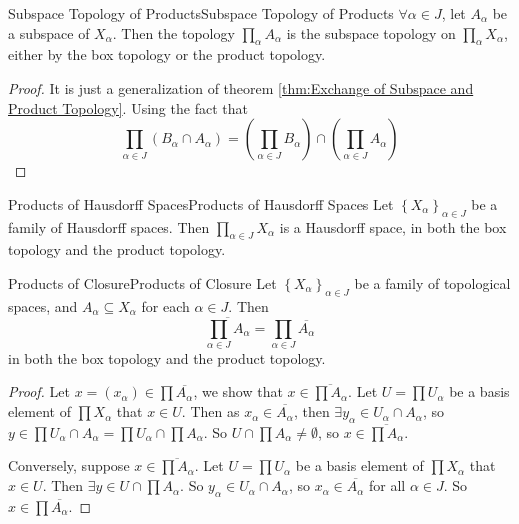 \documentclass[../main.tex]{subfiles}
\begin{document}
\begin{theorem}{Subspace Topology of Products}{Subspace Topology of Products}
$\forall \alpha\in J$, let $A_{\alpha}$ be a subspace of $X_{\alpha}$. Then the topology $\prod_{\alpha} A_{\alpha}$ is the subspace topology on $\prod_{\alpha} X_{\alpha}$, either by the box topology or the product topology.
\end{theorem}
\begin{proof}
It is just a generalization of theorem \ref{thm:Exchange of Subspace and Product Topology}. Using the fact that
\begin{equation*}
\prod_{\alpha\in J} (B_{\alpha} \cap A_{\alpha}) = \left(\prod_{\alpha\in J}B_{\alpha}\right) \cap \left(\prod_{\alpha\in J}A_{\alpha}\right)
\end{equation*}
\end{proof}

\begin{theorem}{Products of Hausdorff Spaces}{Products of Hausdorff Spaces}
Let $\left\{ X_{\alpha} \right\}_{\alpha\in J}$ be a family of Hausdorff spaces. Then $\prod_{\alpha\in J} X_{\alpha}$ is a Hausdorff space, in both the box topology and the product topology.
\end{theorem}

\begin{theorem}{Products of Closure}{Products of Closure}
Let $\left\{ X_{\alpha} \right\}_{\alpha\in J}$ be a family of topological spaces, and $A_{\alpha} \subseteq X_{\alpha}$ for each $\alpha\in J$. Then
\begin{equation*}
	\overline{\prod_{\alpha\in J} A_{\alpha}} = \prod_{\alpha\in J} \overline{A_{\alpha}}
\end{equation*}
in both the box topology and the product topology.
\end{theorem}
\begin{proof}
	Let $x = (x_{\alpha}) \in \prod \overline{A_{\alpha}}$, we show that $x \in \overline{\prod A_{\alpha}}$. Let $U = \prod U_{\alpha}$ be a basis element of $\prod X_{\alpha}$ that $x\in U$. Then as $x_{\alpha}\in \overline{A_{\alpha}}$, then $\exists y_{\alpha}\in U_{\alpha}\cap A_{\alpha}$, so $y\in \prod U_{\alpha}\cap A_{\alpha} = \prod U_{\alpha}\cap \prod A_{\alpha}$. So $U\cap \prod A_{\alpha} \neq \emptyset$, so $x\in \overline{\prod A_{\alpha}}$.

	Conversely, suppose $x\in \overline{\prod A_{\alpha}}$. Let $U = \prod U_{\alpha}$ be a basis element of $\prod X_{\alpha}$ that $x\in U$. Then $\exists y\in U\cap \prod A_{\alpha}$. So $y_{\alpha}\in U_{\alpha}\cap A_{\alpha}$, so $x_{\alpha}\in \overline{A_{\alpha}}$ for all $\alpha\in J$. So $x\in \prod \overline{A_{\alpha}}$.
\end{proof}
\end{document}
